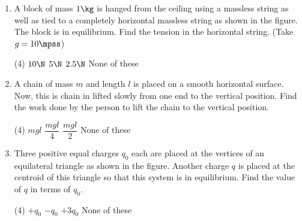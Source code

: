 \documentclass{article}
\renewcommand{\ans}{\quad}
\begin{document}
\begin{enumerate}
    \item A block of mass $1 \kg$ is hanged from the ceiling using a massless string as well as tied to a completely horizontal massless string as shown in the figure. The block is in equilibrium. Find the tension in the horizontal string. (Take $g = 10 \mpss$)
        \begin{center}
        \end{center}
        \begin{tasks}(4)
            \task $10 \N$
            \task $5 \N$
            \task $2.5 \N$
            \task None of these \ans
        \end{tasks}

    \item A chain of mass $m$ and length $l$ is placed on a smooth horizontal surface. Now, this is chain in lifted slowly from one end to the vertical position. Find the work done by the person to lift the chain to the vertical position.
    \begin{center}
    \end{center}
        \begin{tasks}(4)
            \task $mgl$
            \task $\dfrac{mgl}{4}$
            \task $\dfrac{mgl}{2}$\ans
            \task None of these 
        \end{tasks}

    \item Three positive equal charges $q_0$ each are placed at the vertices of an equilateral triangle as shown in the figure. Another charge $q$ is placed at the centroid of this triangle so that this system is in equilibrium. Find the value of $q$ in terms of $q_0$.
        \begin{center}
        \end{center}
        \begin{tasks}(4)
            \task $+q_0$
            \task $-q_0$\ans
            \task $+3q_0$
            \task None of these
        \end{tasks}



\end{enumerate}
\end{document}
